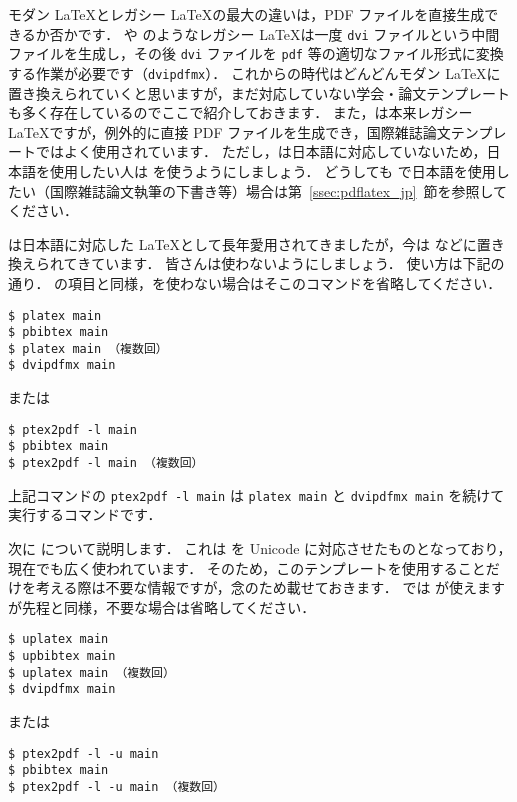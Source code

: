 モダン \LaTeX とレガシー \LaTeX の最大の違いは，PDF ファイルを直接生成できるか否かです．
\pLaTeX や \upLaTeX のようなレガシー \LaTeX は一度 \verb|dvi| ファイルという中間ファイルを生成し，その後 \verb|dvi| ファイルを \verb|pdf| 等の適切なファイル形式に変換する作業が必要です（\verb|dvipdfmx|）．
これからの時代はどんどんモダン \LaTeX に置き換えられていくと思いますが，まだ対応していない学会・論文テンプレートも多く存在しているのでここで紹介しておきます．
また，\pdfLaTeX は本来レガシー \LaTeX ですが，例外的に直接 PDF ファイルを生成でき，国際雑誌論文テンプレートではよく使用されています．
ただし，\pdfLaTeX は日本語に対応していないため，日本語を使用したい人は \LuaLaTeX を使うようにしましょう．
どうしても \pdfLaTeX で日本語を使用したい（国際雑誌論文執筆の下書き等）場合は第~\ref{ssec:pdflatex_jp}~節を参照してください．

\pLaTeX は日本語に対応した \LaTeX として長年愛用されてきましたが，今は \LuaLaTeX などに置き換えられてきています．
皆さんは使わないようにしましょう．
使い方は下記の通り．
\LuaLaTeX の項目と同様，\BibTeX を使わない場合はそこのコマンドを省略してください．

\begin{tcolorbox}[title={\pLaTeX$+$\pBibTeX}]
\begin{verbatim}
$ platex main
$ pbibtex main
$ platex main （複数回）
$ dvipdfmx main
\end{verbatim}
または
\begin{verbatim}
$ ptex2pdf -l main
$ pbibtex main
$ ptex2pdf -l main （複数回）
\end{verbatim}
\end{tcolorbox}

上記コマンドの \verb|ptex2pdf -l main| は \verb|platex main| と \verb|dvipdfmx main| を続けて実行するコマンドです．

次に \upLaTeX について説明します．
これは \pLaTeX を Unicode に対応させたものとなっており，現在でも広く使われています．
そのため，このテンプレートを使用することだけを考える際は不要な情報ですが，念のため載せておきます．
\upLaTeX では \upBibTeX が使えますが先程と同様，不要な場合は省略してください．

\begin{tcolorbox}[title={\upLaTeX$+$\upBibTeX}]
\begin{verbatim}
$ uplatex main
$ upbibtex main
$ uplatex main （複数回）
$ dvipdfmx main
\end{verbatim}
または
\begin{verbatim}
$ ptex2pdf -l -u main
$ pbibtex main
$ ptex2pdf -l -u main （複数回）
\end{verbatim}
\end{tcolorbox}

